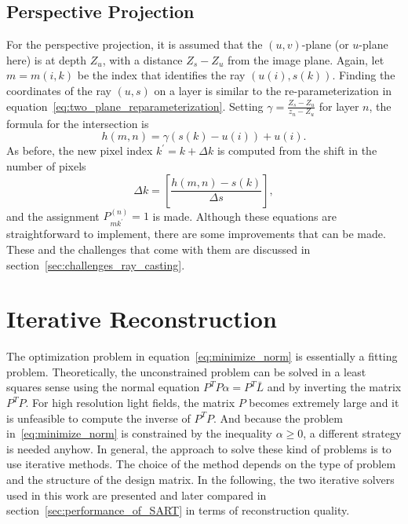 \subsection*{Perspective Projection}

For the perspective projection, it is assumed that the \mbox{$(u, v)$-plane} (or \mbox{$u$-plane} here) is at depth $Z_u$, with a distance $Z_s - Z_u$ from the image plane.
Again, let $m = m(i, k)$ be the index that identifies the ray $(u(i), s(k))$.
Finding the coordinates of the ray $(u, s)$ on a layer is similar to the re-parameterization in equation~\ref{eq:two_plane_reparameterization}.
Setting $\gamma = \frac{Z_s - Z_u}{z_n - Z_u}$ for layer $n$, the formula for the intersection is
\begin{equation}
	h(m, n) = \gamma (s(k) - u(i)) + u(i).
\end{equation}
As before, the new pixel index $k^\prime = k + \Delta k$ is computed from the shift in the number of pixels
\begin{equation}\label{eq:pixel_shift_perspective_projection}
	\Delta k = \left[ \frac{h(m, n) - s(k)}{\Delta s} \right], 
\end{equation}
and the assignment $P_{m k^\prime}^{(n)} = 1$ is made. 
Although these equations are straightforward to implement, there are some improvements that can be made.
These and the challenges that come with them are discussed in section~\ref{sec:challenges_ray_casting}.

\section{Iterative Reconstruction}
\label{sec:iterative_reconstruction}

The optimization problem in equation~\ref{eq:minimize_norm} is essentially a fitting problem.
Theoretically, the unconstrained problem can be solved in a least squares sense using the normal equation $P^T P \alpha = P^T \bar{L}$ and by inverting the matrix $P^T P$.
For high resolution light fields, the matrix $P$ becomes extremely large and it is unfeasible to compute the inverse of $P^T P$.
And because the problem in~\ref{eq:minimize_norm} is constrained by the inequality $\alpha \geq 0$, a different strategy is needed anyhow.
In general, the approach to solve these kind of problems is to use iterative methods.
The choice of the method depends on the type of problem and the structure of the design matrix.
In the following, the two iterative solvers used in this work are presented and later compared in section~\ref{sec:performance_of_SART} in terms of reconstruction quality.

